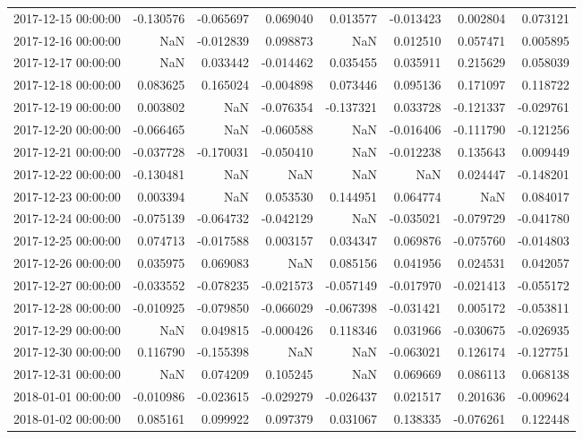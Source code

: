 \begin{tabular}{lrrrrrrr}
2017-12-15 00:00:00 & -0.130576 & -0.065697 & 0.069040 & 0.013577 & -0.013423 & 0.002804 & 0.073121 \\
2017-12-16 00:00:00 & NaN & -0.012839 & 0.098873 & NaN & 0.012510 & 0.057471 & 0.005895 \\
2017-12-17 00:00:00 & NaN & 0.033442 & -0.014462 & 0.035455 & 0.035911 & 0.215629 & 0.058039 \\
2017-12-18 00:00:00 & 0.083625 & 0.165024 & -0.004898 & 0.073446 & 0.095136 & 0.171097 & 0.118722 \\
2017-12-19 00:00:00 & 0.003802 & NaN & -0.076354 & -0.137321 & 0.033728 & -0.121337 & -0.029761 \\
2017-12-20 00:00:00 & -0.066465 & NaN & -0.060588 & NaN & -0.016406 & -0.111790 & -0.121256 \\
2017-12-21 00:00:00 & -0.037728 & -0.170031 & -0.050410 & NaN & -0.012238 & 0.135643 & 0.009449 \\
2017-12-22 00:00:00 & -0.130481 & NaN & NaN & NaN & NaN & 0.024447 & -0.148201 \\
2017-12-23 00:00:00 & 0.003394 & NaN & 0.053530 & 0.144951 & 0.064774 & NaN & 0.084017 \\
2017-12-24 00:00:00 & -0.075139 & -0.064732 & -0.042129 & NaN & -0.035021 & -0.079729 & -0.041780 \\
2017-12-25 00:00:00 & 0.074713 & -0.017588 & 0.003157 & 0.034347 & 0.069876 & -0.075760 & -0.014803 \\
2017-12-26 00:00:00 & 0.035975 & 0.069083 & NaN & 0.085156 & 0.041956 & 0.024531 & 0.042057 \\
2017-12-27 00:00:00 & -0.033552 & -0.078235 & -0.021573 & -0.057149 & -0.017970 & -0.021413 & -0.055172 \\
2017-12-28 00:00:00 & -0.010925 & -0.079850 & -0.066029 & -0.067398 & -0.031421 & 0.005172 & -0.053811 \\
2017-12-29 00:00:00 & NaN & 0.049815 & -0.000426 & 0.118346 & 0.031966 & -0.030675 & -0.026935 \\
2017-12-30 00:00:00 & 0.116790 & -0.155398 & NaN & NaN & -0.063021 & 0.126174 & -0.127751 \\
2017-12-31 00:00:00 & NaN & 0.074209 & 0.105245 & NaN & 0.069669 & 0.086113 & 0.068138 \\
2018-01-01 00:00:00 & -0.010986 & -0.023615 & -0.029279 & -0.026437 & 0.021517 & 0.201636 & -0.009624 \\
2018-01-02 00:00:00 & 0.085161 & 0.099922 & 0.097379 & 0.031067 & 0.138335 & -0.076261 & 0.122448 \\

\end{tabular}
